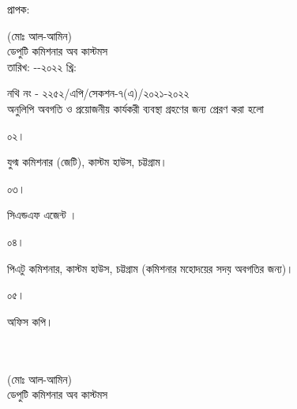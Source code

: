 \documentclass[12pt]{article}
\newcommand{\fileno}{নথি নং - ২২৫২/এপি/সেকশন-৭(এ)/২০২১-২০২২}
\newcommand{\impn}{\jeal}
\newcommand{\impadd}{\jeala}
\newcommand{\rodt}{\hspace{3em}-\hspace{3em}-২০২২ খ্রি:}
\begin{document}
\begin{minipage}[t]{0.05\linewidth}
প্রাপক:
\end{minipage}
\begin{minipage}[t]{0.65\linewidth}
{\impn}
\end{minipage}
\begin{minipage}[t]{0.30\linewidth}
\hspace{0em}
\end{minipage}
\begin{minipage}[t]{0.05\linewidth}
\hspace{0em}
\end{minipage}
\begin{minipage}[t]{0.65\linewidth}
{\impadd}
\end{minipage}
\begin{minipage}[t]{0.30\linewidth}
\begin{center}
(মোঃ আল-আমিন)
\\
ডেপুটি কমিশনার অব কাস্টমস
\\
তারিখ: {\rodt}
\end{center}
\end{minipage}
\newline
{\fileno}
\\
অনুলিপি অবগতি ও প্রয়োজনীয় কার্যকরী ব্যবস্থা গ্রহণের জন্য প্রেরণ করা হলো
\\
\begin{minipage}[t]{0.06\linewidth}
০২।
\end{minipage}
\begin{minipage}[t]{0.94\linewidth}
যুগ্ম কমিশনার (জেটি), কাস্টম হাউস, চট্টগ্রাম।
\end{minipage}
\begin{minipage}[t]{0.06\linewidth}
০৩।
\end{minipage}
\begin{minipage}[t]{0.94\linewidth}
সিএন্ডএফ এজেন্ট {\cnfn}।
\end{minipage}
\begin{minipage}[t]{0.06\linewidth}
০৪।
\end{minipage}
\begin{minipage}[t]{0.94\linewidth}
পিএটু কমিশনার, কাস্টম হাউস, চট্টগ্রাম (কমিশনার মহোদয়ের সদয় অবগতির জন্য)।
\end{minipage}
\begin{minipage}[t]{0.06\linewidth}
০৫।
\end{minipage}
\begin{minipage}[t]{0.94\linewidth}
অফিস কপি।
\\
\\
\\
\end{minipage}
\begin{minipage}[t]{0.70\linewidth}
\hspace{0em}
\end{minipage}
\begin{minipage}[t]{0.30\linewidth}
\begin{center}
(মোঃ আল-আমিন)
\\
ডেপুটি কমিশনার অব কাস্টমস
\end{center}
\end{minipage}
\thispagestyle{case}
\end{document}

